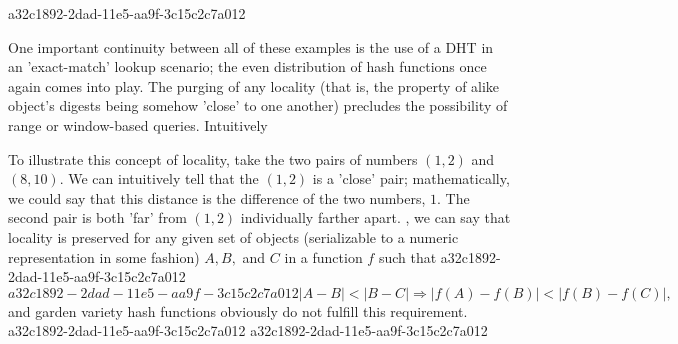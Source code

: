 \documentclass[12pt]{article}
\begin{document}
a32c1892-2dad-11e5-aa9f-3c15c2c7a012\par One important continuity between all of these examples is the use of a DHT in an 'exact-match' lookup scenario; the even distribution of hash functions once again comes into play. The purging of any locality (that is, the property of alike object's digests being somehow 'close' to one another) precludes the possibility of range or window-based queries. Intuitively

\par To illustrate this concept of locality, take the two pairs of numbers $(1,2)$ and $(8,10)$. We can intuitively tell that the $(1,2)$ is a 'close' pair; mathematically, we could say that this distance is the difference of the two numbers, $1$. The second pair is both 'far' from $(1,2)$ individually farther apart. , we can say that locality is preserved for any given set of objects (serializable to a numeric representation in some fashion) $A,B,$ and $C$ in a function $f$ such that
a32c1892-2dad-11e5-aa9f-3c15c2c7a012\begin{equation}
a32c1892-2dad-11e5-aa9f-3c15c2c7a012|A-B| < |B-C| \Rightarrow |f(A)-f(B)| < |f(B) - f(C)|,
\end{equation}
and garden variety hash functions obviously do not fulfill this requirement.
a32c1892-2dad-11e5-aa9f-3c15c2c7a012
\printbibliography
a32c1892-2dad-11e5-aa9f-3c15c2c7a012
\end{document}

